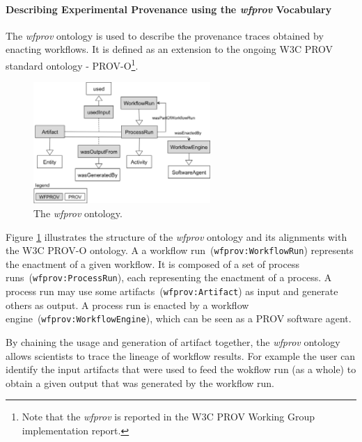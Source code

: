 \paragraph{Describing Experimental Provenance using the \textit{wfprov} Vocabulary}
The \textit{wfprov} ontology is used to describe the provenance traces obtained by enacting  workflows. It is defined as an extension to the ongoing W3C PROV standard ontology - PROV-O\footnote{Note that the \textit{wfprov} is reported in the W3C PROV Working Group implementation report.}.

\begin{figure}[ht]
  \centering
  \includegraphics[width=0.6\textwidth]{Figures/wfprov.png}
  \caption{The \textit{wfprov} ontology.}
  \label{fig:wfprov}
\end{figure}

Figure \ref{fig:wfprov} illustrates the structure of the \textit{wfprov} ontology and its alignments with the W3C PROV-O ontology. A a workflow run~(\texttt{wfprov:WorkflowRun}) represents the enactment of a given workflow. It is composed of a set of process runs~(\texttt{wfprov:ProcessRun}), each representing the enactment of a process. A process run may use some artifacts~(\texttt{wfprov:Artifact}) as input and generate others as output. A process run is enacted by a workflow engine~(\texttt{wfprov:WorkflowEngine}), which can be seen as a PROV software agent.

By chaining the usage and generation of artifact together, the \textit{wfprov} ontology allows scientists to trace the lineage of workflow results. For example the user can identify the input artifacts that were used to feed the wokflow run (as a whole) to obtain a given output that was generated by the workflow run.

